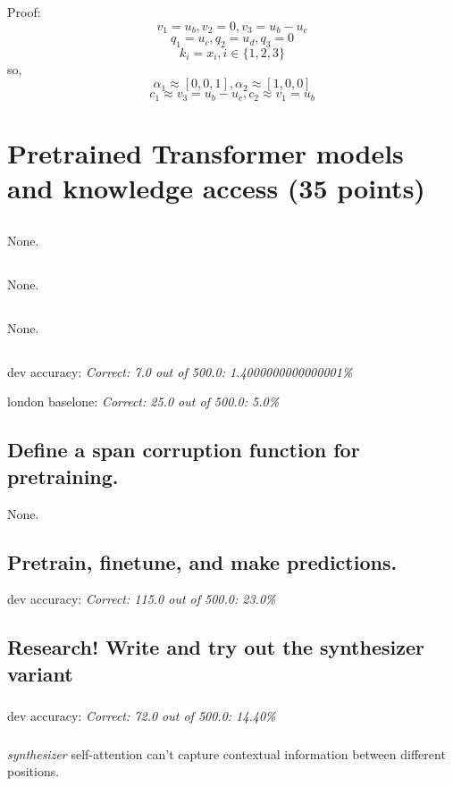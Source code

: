 \documentclass{homework}
\begin{document}
Proof:
$$
v_{1}=u_{b}, v_{2}=0, v_{3}=u_{b}-u_{c}
$$
$$
q_{1}=u_{c}, q_{2}=u_d, q_{3}=0
$$
$$
k_i=x_i, i\in \{1,2,3\}
$$
\quad so,
$$
\alpha_{1} \approx[0,0,1], \alpha_{2} \approx[1,0,0]
$$
$$
c_{1} \approx v_{3}=u_{b}-u_{c}, c_{2} \approx v_{1}=u_{b}
$$



\section{Pretrained Transformer models and knowledge access (35 points)}
\subsection{} None.
\subsection{} None.
\subsection{} None.
\subsection{}
dev accuracy: \textsl{Correct: 7.0 out of 500.0: 1.4000000000000001\%}

london baselone: \textsl{Correct: 25.0 out of 500.0: 5.0\%}

\subsection{Define a span corruption function for pretraining.}
None.

\subsection{Pretrain, finetune, and make predictions.}
dev accuracy: \textsl{Correct: 115.0 out of 500.0: 23.0\%}

\subsection{Research! Write and try out the synthesizer variant}
\subsubsection{}
dev accuracy: \textsl{Correct: 72.0 out of 500.0: 14.40\%}

\subsubsection{}
\textit{synthesizer} self-attention can't capture contextual information between different positions.
\end{document}
